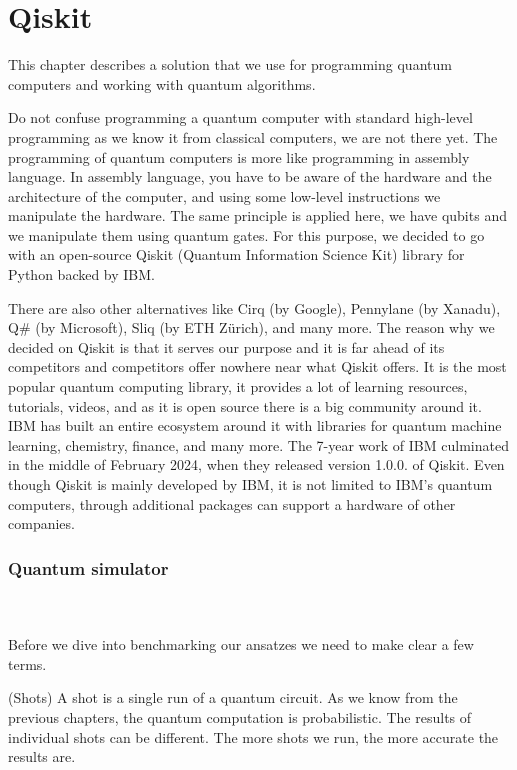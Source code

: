\chapter{Qiskit}\label{ch:qiskit}
This chapter describes a solution that we use for programming quantum computers and working with quantum algorithms. 

Do not confuse programming a quantum computer with standard high-level programming as we know it from classical computers, we are not there yet. The programming of quantum computers is more like programming in assembly language. In assembly language, you have to be aware of the hardware and the architecture of the computer, and using some low-level instructions we manipulate the hardware. The same principle is applied here, we have qubits and we manipulate them using quantum gates. For this purpose, we decided to go with an open-source Qiskit (Quantum Information Science Kit) library for Python backed by IBM.

There are also other alternatives like Cirq (by Google), Pennylane (by Xanadu), Q\# (by Microsoft), Sliq (by ETH Zürich), and many more.  The reason why we decided on Qiskit is that it serves our purpose and it is far ahead of its competitors and competitors offer nowhere near what Qiskit offers. It is the most popular quantum computing library, it provides a lot of learning resources, tutorials, videos, and as it is open source there is a big community around it. IBM has built an entire ecosystem around it \cite{qiskit_ecosystem} with libraries for quantum machine learning, chemistry, finance, and many more. The 7-year work of IBM culminated in the middle of February 2024, when they released version 1.0.0. of Qiskit. Even though Qiskit is mainly developed by IBM, it is not limited to IBM's quantum computers, through additional packages can support a hardware of other companies.

\subsection{Quantum simulator}
\\
\\
Before we dive into benchmarking our ansatzes we need to make clear a few terms.

\begin{definition} (Shots) 
    A shot is a single run of a quantum circuit. As we know from the previous chapters, the quantum computation is probabilistic. The results of individual shots can be different. The more shots we run, the more accurate the results are.
\end{definition}

